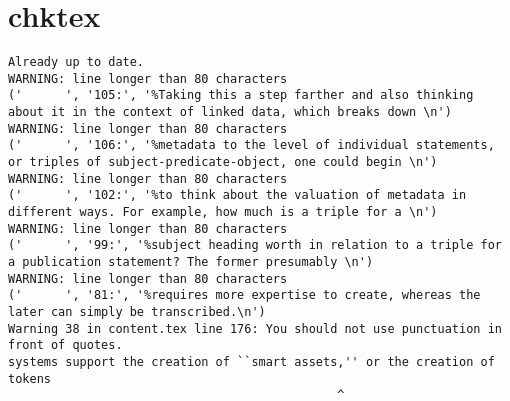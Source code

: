 \appendix
\section{chktex}
\begin{tiny}
\begin{verbatim}
Already up to date.
WARNING: line longer than 80 characters
('      ', '105:', '%Taking this a step farther and also thinking about it in the context of linked data, which breaks down \n')
WARNING: line longer than 80 characters
('      ', '106:', '%metadata to the level of individual statements, or triples of subject-predicate-object, one could begin \n')
WARNING: line longer than 80 characters
('      ', '102:', '%to think about the valuation of metadata in different ways. For example, how much is a triple for a \n')
WARNING: line longer than 80 characters
('      ', '99:', '%subject heading worth in relation to a triple for a publication statement? The former presumably \n')
WARNING: line longer than 80 characters
('      ', '81:', '%requires more expertise to create, whereas the later can simply be transcribed.\n')
Warning 38 in content.tex line 176: You should not use punctuation in front of quotes.
systems support the creation of ``smart assets,'' or the creation of tokens  
                                              ^
\end{verbatim}
\end{tiny}
